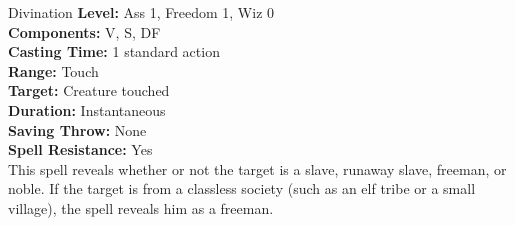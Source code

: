 {Divination}
{
	\textbf{Level:}
	Ass 1, Freedom 1, Wiz 0\\
	\textbf{Components:}
	V, S, DF\\
	\textbf{Casting Time:}
	1 standard action\\
	\textbf{Range:}
	Touch\\
	\textbf{Target:}
	Creature touched\\
	\textbf{Duration:}
	Instantaneous\\
	\textbf{Saving Throw:}
	None\\
	\textbf{Spell Resistance:}
	Yes\\
}
{
	This spell reveals whether or not the target is a slave, runaway slave, freeman, or noble. If the target is from a classless society (such as an elf tribe or a small village), the spell reveals him as a freeman.
}

